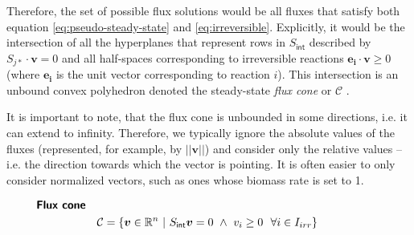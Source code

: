 \documentclass[10pt,a4paper]{article}
\newcommand{\mymatrix}[1]{#1}
\newcommand{\myvector}[1]{{\boldsymbol{#1}}}
\newcommand{\fluxcone}{\mathcal{C}}
\newcommand{\stoichmatint}{\mymatrix{S}_{\mathsf{int}}}
\begin{document}
Therefore, the set of possible flux solutions would be all fluxes that satisfy both equation \ref{eq:pseudo-steady-state} and \ref{eq:irreversible}. Explicitly, it would be the intersection of all the hyperplanes that represent rows in $\stoichmatint$ described by $S_{j*}\cdot \myvector{v} = 0$ and all half-spaces corresponding to irreversible reactions $\myvector{e_i} \cdot \myvector{v} \geq 0$ (where $\myvector{e_i}$ is the unit vector corresponding to reaction $i$). This intersection is an unbound convex polyhedron denoted the steady-state \emph{flux cone} or $\fluxcone$ \cite{marashi_analysis_2012}.
	
It is important to note, that the flux cone is unbounded in some directions, i.e. it can extend to infinity. Therefore, we typically ignore the absolute values of the fluxes (represented, for example, by $||\myvector{v}||$) and consider only the relative values -- i.e. the direction towards which the vector is pointing. It is often easier to only consider normalized vectors, such as ones whose biomass rate is set to 1.
	
\begin{eqnarray}\label{eq:fluxcone}
	&\textsf{\textbf{Flux cone}} &\nonumber\\
	&&\fluxcone = \{\myvector{v} \in \mathbb{R}^n~|~\stoichmatint\myvector{v} = 0 ~\wedge ~ v_i \geq 0~~\forall i \in I_{irr}\}~~~~~~~~~~~~~~~~~
\end{eqnarray}
\end{document}
